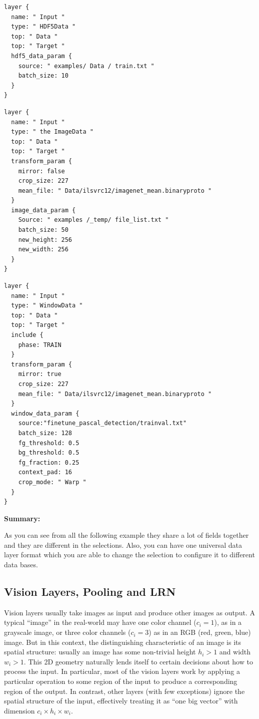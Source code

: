 \documentclass[12pt]{article}
\begin{document}
\begin{lstlisting}[style=json, frame=single]
layer {
  name: " Input "
  type: " HDF5Data "
  top: " Data "
  top: " Target "
  hdf5_data_param {
    source: " examples/ Data / train.txt "
    batch_size: 10
  }
}
\end{lstlisting}


\begin{lstlisting}[style=json, frame=single]
layer {
  name: " Input "
  type: " the ImageData "
  top: " Data "
  top: " Target "
  transform_param {
    mirror: false
    crop_size: 227
    mean_file: " Data/ilsvrc12/imagenet_mean.binaryproto "
  }
  image_data_param {
    Source: " examples /_temp/ file_list.txt "
    batch_size: 50
    new_height: 256
    new_width: 256
  }
}
\end{lstlisting}


\begin{lstlisting}[style=json, frame=single]
layer {
  name: " Input "
  type: " WindowData "
  top: " Data "
  top: " Target "
  include {
    phase: TRAIN
  }
  transform_param {
    mirror: true
    crop_size: 227
    mean_file: " Data/ilsvrc12/imagenet_mean.binaryproto "
  }
  window_data_param {
    source:"finetune_pascal_detection/trainval.txt"
    batch_size: 128
    fg_threshold: 0.5
    bg_threshold: 0.5
    fg_fraction: 0.25
    context_pad: 16
    crop_mode: " Warp "
  }
}
\end{lstlisting}

\textbf{Summary:}

\noindent As you can see from all the following example they share a lot of fields together and they are different in the selections. Also, you can have one universal data layer format which you are able to change the selection to configure it to different data bases.

\newpage

\subsection{Vision Layers, Pooling and LRN}

Vision layers usually take images as input and produce other images as output. A typical “image” in the real-world may have one color channel ($c_{i}=1$), as in a grayscale image, or three color channels ($c_{i}=3$) as in an RGB (red, green, blue) image. But in this context, the distinguishing characteristic of an image is its spatial structure: usually an image has some non-trivial height $h_{i}>1$ and width $w_{i}>1$. This 2D geometry naturally lends itself to certain decisions about how to process the input. In particular, most of the vision layers work by applying a particular operation to some region of the input to produce a corresponding region of the output. In contrast, other layers (with few exceptions) ignore the spatial structure of the input, effectively treating it as “one big vector” with dimension $c_{i} \times h_{i} \times w_{i}$.
\end{document}
